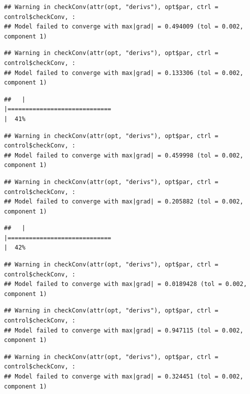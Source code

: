 \documentclass[
  12pt,
]{book}
\begin{document}
\begin{verbatim}
## Warning in checkConv(attr(opt, "derivs"), opt$par, ctrl = control$checkConv, :
## Model failed to converge with max|grad| = 0.494009 (tol = 0.002, component 1)
\end{verbatim}

\begin{verbatim}
## Warning in checkConv(attr(opt, "derivs"), opt$par, ctrl = control$checkConv, :
## Model failed to converge with max|grad| = 0.133306 (tol = 0.002, component 1)
\end{verbatim}

\begin{verbatim}
##   |                                                                              |=============================                                         |  41%
\end{verbatim}

\begin{verbatim}
## Warning in checkConv(attr(opt, "derivs"), opt$par, ctrl = control$checkConv, :
## Model failed to converge with max|grad| = 0.459998 (tol = 0.002, component 1)
\end{verbatim}

\begin{verbatim}
## Warning in checkConv(attr(opt, "derivs"), opt$par, ctrl = control$checkConv, :
## Model failed to converge with max|grad| = 0.205882 (tol = 0.002, component 1)
\end{verbatim}

\begin{verbatim}
##   |                                                                              |=============================                                         |  42%
\end{verbatim}

\begin{verbatim}
## Warning in checkConv(attr(opt, "derivs"), opt$par, ctrl = control$checkConv, :
## Model failed to converge with max|grad| = 0.0189428 (tol = 0.002, component 1)
\end{verbatim}

\begin{verbatim}
## Warning in checkConv(attr(opt, "derivs"), opt$par, ctrl = control$checkConv, :
## Model failed to converge with max|grad| = 0.947115 (tol = 0.002, component 1)
\end{verbatim}

\begin{verbatim}
## Warning in checkConv(attr(opt, "derivs"), opt$par, ctrl = control$checkConv, :
## Model failed to converge with max|grad| = 0.324451 (tol = 0.002, component 1)
\end{verbatim}
\end{document}
